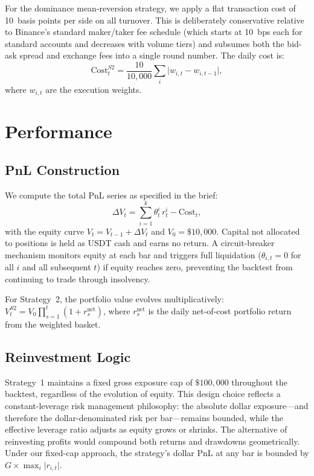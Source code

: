 \documentclass[11pt,a4paper]{article}
\newcommand{\abs}[1]{\lvert #1 \rvert}
\begin{document}
For the dominance mean-reversion strategy, we apply a flat transaction cost of 10~basis points per side on all turnover.  This is deliberately conservative relative to Binance's standard maker/taker fee schedule (which starts at 10~bps each for standard accounts and decreases with volume tiers) and subsumes both the bid-ask spread and exchange fees into a single round number.  The daily cost is:
\begin{equation}
  \text{Cost}^{S2}_t = \frac{10}{10{,}000} \sum_i \abs{w_{i,t} - w_{i,t-1}},
  \label{eq:cost-s2}
\end{equation}
where $w_{i,t}$ are the execution weights.


\section{Performance}
\label{sec:performance}

\subsection{PnL Construction}

We compute the total PnL series as specified in the brief:
\begin{equation}
  \Delta V_t = \sum_{i=1}^{k} \theta^i_t \, r^i_t - \text{Cost}_t,
  \label{eq:pnl}
\end{equation}
with the equity curve $V_t = V_{t-1} + \Delta V_t$ and $V_0 = \$10{,}000$.  Capital not allocated to positions is held as USDT cash and earns no return.  A circuit-breaker mechanism monitors equity at each bar and triggers full liquidation ($\theta_{i,t} = 0$ for all $i$ and all subsequent $t$) if equity reaches zero, preventing the backtest from continuing to trade through insolvency.

For Strategy~2, the portfolio value evolves multiplicatively: $V^{S2}_t = V_0 \prod_{s=1}^{t}(1 + r^{\text{net}}_{s})$, where $r^{\text{net}}_{s}$ is the daily net-of-cost portfolio return from the weighted basket.

\subsection{Reinvestment Logic}

Strategy~1 maintains a fixed gross exposure cap of $\$100{,}000$ throughout the backtest, regardless of the evolution of equity.  This design choice reflects a constant-leverage risk management philosophy: the absolute dollar exposure---and therefore the dollar-denominated risk per bar---remains bounded, while the effective leverage ratio adjusts as equity grows or shrinks.  The alternative of reinvesting profits would compound both returns and drawdowns geometrically.  Under our fixed-cap approach, the strategy's dollar PnL at any bar is bounded by $G \times \max_i \abs{r_{i,t}}$.
\end{document}
